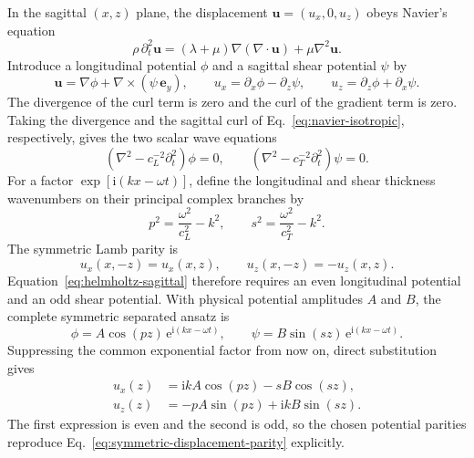 In the sagittal \((x,z)\) plane, the displacement
\(\mathbf{u}=(u_x,0,u_z)\) obeys Navier's equation
\begin{equation}
  \rho\,\partial_t^2\mathbf{u}
  = (\lambda+\mu)\nabla(\nabla\mathbin{\cdot}\mathbf{u})
    +\mu\nabla^2\mathbf{u}.
  \label{eq:navier-isotropic}
\end{equation}
Introduce a longitudinal potential \(\phi\) and a sagittal shear potential
\(\psi\) by
\begin{equation}
  \mathbf{u}
  =\nabla\phi+\nabla\mathbin{\times}(\psi\,\mathbf{e}_y),
  \qquad
  u_x=\partial_x\phi-\partial_z\psi,
  \qquad
  u_z=\partial_z\phi+\partial_x\psi.
  \label{eq:helmholtz-sagittal}
\end{equation}
The divergence of the curl term is zero and the curl of the gradient term is
zero.  Taking the divergence and the sagittal curl of
Eq.~\eqref{eq:navier-isotropic}, respectively, gives the two scalar wave
equations
\begin{equation}
  \left(\nabla^2-c_L^{-2}\partial_t^2\right)\phi=0,
  \qquad
  \left(\nabla^2-c_T^{-2}\partial_t^2\right)\psi=0.
  \label{eq:potential-wave-equations}
\end{equation}
For a factor \(\exp[\mathrm{i}(kx-\omega t)]\), define the longitudinal and
shear thickness wavenumbers on their principal complex branches by
\begin{equation}
  p^2=\frac{\omega^2}{c_L^2}-k^2,
  \qquad
  s^2=\frac{\omega^2}{c_T^2}-k^2.
  \label{eq:thickness-wavenumbers}
\end{equation}
The symmetric Lamb parity is
\begin{equation}
  u_x(x,-z)=u_x(x,z),
  \qquad
  u_z(x,-z)=-u_z(x,z).
  \label{eq:symmetric-displacement-parity}
\end{equation}
Equation~\eqref{eq:helmholtz-sagittal} therefore requires an even
longitudinal potential and an odd shear potential.  With physical potential
amplitudes \(A\) and \(B\), the complete symmetric separated ansatz is
\begin{equation}
  \phi=A\cos(pz)\,\mathrm{e}^{\mathrm{i}(kx-\omega t)},
  \qquad
  \psi=B\sin(sz)\,\mathrm{e}^{\mathrm{i}(kx-\omega t)}.
  \label{eq:symmetric-potentials}
\end{equation}
Suppressing the common exponential factor from now on, direct substitution
gives
\begin{align}
  u_x(z)
  &=\mathrm{i}kA\cos(pz)-sB\cos(sz),
  \label{eq:symmetric-ux}\\
  u_z(z)
  &=-pA\sin(pz)+\mathrm{i}kB\sin(sz).
  \label{eq:symmetric-uz}
\end{align}
The first expression is even and the second is odd, so the chosen potential
parities reproduce Eq.~\eqref{eq:symmetric-displacement-parity} explicitly.

